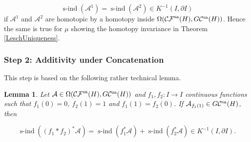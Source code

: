\documentclass[a4paper,10pt]{article}
\newtheorem{lemma}[theorem]{Lemma}
\DeclareMathOperator{\sind}{s-ind}
\begin{document}
\[\sind(\mathcal{A}^1)=\sind(\mathcal{A}^2)\in K^{-1}(I,\partial I)\]
if $\mathcal{A}^1$ and $\mathcal{A}^2$ are homotopic by a homotopy inside $\Omega(\mathcal{CF}^\textup{sa}(H),G\mathcal{C}^\textup{sa}(H))$. Hence the same is true for $\mu$ showing the homotopy invariance in Theorem \ref{LeschUniqueness}. 


\subsubsection*{Step 2: Additivity under Concatenation}
This step is based on the following rather technical lemma.

\begin{lemma} 
Let $\mathcal{A}\in\Omega(\mathcal{CF}^\textup{sa}(H),G\mathcal{C}^\textup{sa}(H))$ and $f_1,f_2:I\rightarrow I$ continuous functions such that $f_1(0)=0$, $f_2(1)=1$ and $f_1(1)=f_2(0)$. If $\mathcal{A}_{f_1(1)}\in G\mathcal{C}^\textup{sa}(H)$, then

\[\sind((f_1\ast f_2)^\ast\mathcal{A})=\sind(f^\ast_1\mathcal{A})+\sind(f^\ast_2\mathcal{A})\in K^{-1}(I,\partial I).\]
\end{lemma}
\end{document}

